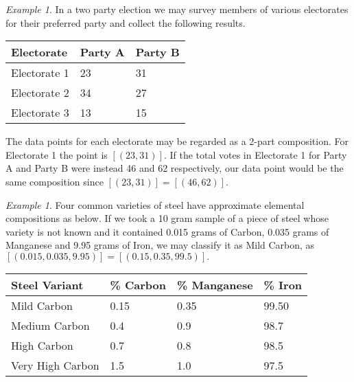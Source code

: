 \documentclass[BSc]{usydthesis}
\numberwithin{equation}{chapter}
\theoremstyle{remark}
\newtheorem{Example}[equation]{Example}
\begin{document}
\begin{Example}
In a two party election we may survey members of various electorates for their preferred party and collect the following results.

\begin{table}[hbt!]
\centering
\begin{tabular}{|l|l|l|} 
\hline
Electorate   & Party A & Party B  \\ 
\hline
Electorate 1 &   23    &   31     \\
Electorate 2 &   34    &   27     \\
Electorate 3 &   13    &   15     \\
\hline
\end{tabular}
\end{table}

The data points for each electorate may be regarded as a 2-part composition. For Electorate 1 the point is $[(23,31)].$ If the total votes in Electorate 1 for Party A and Party B were instead 46 and 62 respectively, our data point would be the same composition since $[(23,31)] = [(46,62)].$ 
\end{Example}

\begin{Example}

Four common varieties of steel have approximate elemental compositions as below. If we took a 10 gram sample of a piece of steel whose variety is not known and it contained 0.015 grams of Carbon, 0.035 grams of Manganese and 9.95 grams of Iron, we may classify it as Mild Carbon, as $[(0.015, 0.035, 9.95)] = [(0.15, 0.35, 99.5)].$

\begin{table}[hbt!]
\centering
\begin{tabular}{|l|l|l|l|} 
\hline
Steel Variant    & \% Carbon & \% Manganese & \% Iron  \\ 
\hline
Mild Carbon      & 0.15      & 0.35         & 99.50    \\
Medium Carbon    & 0.4       & 0.9          & 98.7     \\
High Carbon      & 0.7       & 0.8          & 98.5     \\
Very High Carbon & 1.5       & 1.0          & 97.5     \\
\hline
\end{tabular}
\end{table}
\end{Example}
\end{document}
